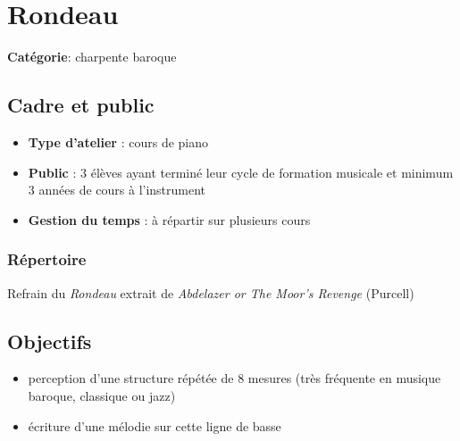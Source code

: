 \documentclass[a4paper,11pt,bibliography=totoc,numbers=noenddot,listof=flat,DIV=11,BCOR=0mm]{scrreprt}%
\begin{document}
\chapter[Charpente baroque: Rondeau]{Rondeau}


{\large \textbf{Catégorie}}: charpente baroque



\section*{Cadre et public}
\begin{itemize}
\item [\textbullet]\textbf{Type d'atelier} : cours de piano
\item [\textbullet]\textbf{Public} : 3 élèves ayant terminé leur cycle de formation musicale et minimum 3 années de cours à l'instrument
\item [\textbullet]\textbf{Gestion du temps} : à répartir sur plusieurs cours
\end{itemize}


\subsection*{Répertoire}
Refrain du \emph{Rondeau} extrait de \emph{Abdelazer or The Moor's Revenge} (Purcell)




\section*{Objectifs}
\begin{itemize}
\item perception d'une structure répétée de 8 mesures (très fréquente en musique baroque, classique ou jazz)
\item écriture d'une mélodie sur cette ligne de basse
\end{itemize}
\end{document}
